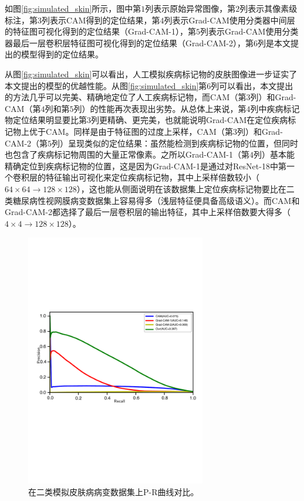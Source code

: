 如图\ref{fig:simulated_skin}所示，图中第$1$列表示原始异常图像，第$2$列表示其像素级标注，第$3$列表示CAM得到的定位结果，第$4$列表示Grad-CAM使用分类器中间层的特征图可视化得到的定位结果（Grad-CAM-1），第$5$列表示Grad-CAM使用分类器最后一层卷积层特征图可视化得到的定位结果（Grad-CAM-2），第$6$列是本文提出的模型得到的定位结果。

从图\ref{fig:simulated_skin}可以看出，人工模拟疾病标记物的皮肤图像进一步证实了本文提出的模型的优越性能。从图\ref{fig:simulated_skin}第$6$列可以看出，本文提出的方法几乎可以完美、精确地定位了人工疾病标记物，而CAM（第$3$列）和Grad-CAM（第$4$列和第$5$列）的性能再次表现出劣势。从总体上来说，第$4$列中疾病标记物定位结果明显要比第$3$列更精确、更完美，也就能说明Grad-CAM在定位疾病标记物上优于CAM。同样是由于特征图的过度上采样，CAM（第$3$列）和Grad-CAM-2（第$5$列）呈现类似的定位结果：虽然能检测到疾病标记物的位置，但同时也包含了疾病标记物周围的大量正常像素。之所以Grad-CAM-1（第$4$列）基本能精确定位到疾病标记物的位置，这是因为Grad-CAM-1是通过对ResNet-18中第一个卷积层的特征输出可视化来定位疾病标记物，其中上采样倍数较小（$64\times 64\rightarrow 128\times 128$），这也能从侧面说明在该数据集上定位疾病标记物要比在二类糖尿病性视网膜病变数据集上容易得多（浅层特征便具备高级语义）。而CAM和Grad-CAM-2都选择了最后一层卷积层的输出特征，其中上采样倍数要大得多（$4\times4\rightarrow 128\times 128$）。
\begin{figure}[h]
	\centering
	\includegraphics[width=0.7\textwidth]{figure/pr_curve_skin_image/pr_curve}
	\caption[在二类模拟皮肤病病变数据集上P-R曲线对比]{在二类模拟皮肤病病变数据集上P-R曲线对比。}
	\label{fig:simulated_skin_pr_curve}
\end{figure}

